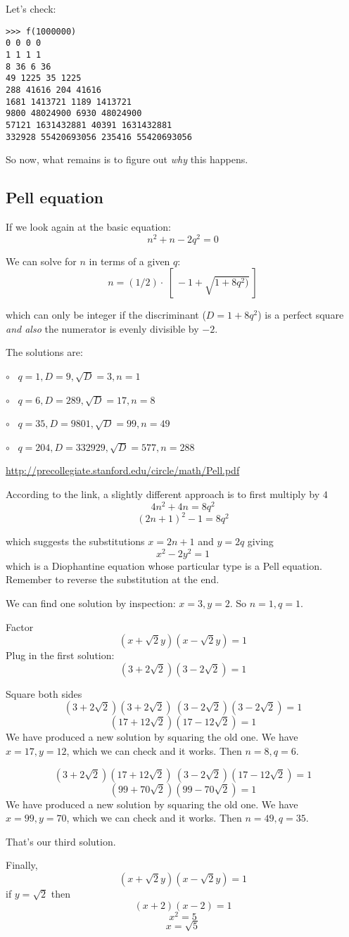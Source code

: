 \documentclass[11pt, oneside]{article}
\begin{document}
Let's check:
\begin{verbatim}
>>> f(1000000)
0 0 0 0
1 1 1 1
8 36 6 36
49 1225 35 1225
288 41616 204 41616
1681 1413721 1189 1413721
9800 48024900 6930 48024900
57121 1631432881 40391 1631432881
332928 55420693056 235416 55420693056
\end{verbatim}

So now, what remains is to figure out \emph{why} this happens.


\subsection*{Pell equation}

If we look again at the basic equation:
\[ n^2 + n - 2q^2 = 0 \]

We can solve for $n$ in terms of a given $q$:
\[ n = (1/2) \cdot \ [ \ -1 + \sqrt{1 + 8q^2)} \ ]  \]

which can only be integer if the discriminant ($D = 1 + 8q^2$) is a perfect square \emph{and also} the numerator is evenly divisible by $-2$.

The solutions are:

$\circ$ \ $q = 1, D = 9, \sqrt{D} = 3, n = 1$

$\circ$ \ $q = 6, D = 289, \sqrt{D} = 17, n = 8$

$\circ$ \ $q = 35, D = 9801, \sqrt{D} = 99, n = 49$

$\circ$ \ $q = 204, D = 332929, \sqrt{D} = 577, n = 288$

\url{http://precollegiate.stanford.edu/circle/math/Pell.pdf}

According to the link, a slightly different approach is to first multiply by $4$
\[ 4n^2 + 4n = 8q^2 \]
\[ (2n + 1)^2 - 1 = 8q^2 \]

which suggests the substitutions $x = 2n + 1$ and $y = 2q$ giving
\[ x^2 - 2y^2 = 1 \]
which is a Diophantine equation whose particular type is a Pell equation.  Remember to reverse the substitution at the end.

We can find one solution by inspection:  $x = 3, y = 2$.  So $n = 1, q = 1$.

Factor
\[ (x + \sqrt{2}y)(x - \sqrt{2}y) = 1 \]
Plug in the first solution:
\[ (3 + 2\sqrt{2})(3 - 2\sqrt{2}) = 1 \]

Square both sides
\[ (3 + 2\sqrt{2})(3 + 2\sqrt{2}) \ (3 - 2\sqrt{2})(3 - 2\sqrt{2}) = 1 \]
\[ (17 + 12\sqrt{2}) (17 - 12\sqrt{2}) = 1 \]
We have produced a new solution by squaring the old one.  We have $x = 17, y = 12$, which we can check and it works.  Then $n = 8, q = 6$.

\[ (3 + 2\sqrt{2})(17 + 12\sqrt{2}) \ (3 - 2\sqrt{2})(17 - 12\sqrt{2}) = 1 \]
\[ (99 + 70\sqrt{2}) (99 - 70\sqrt{2}) = 1 \]
We have produced a new solution by squaring the old one.  We have $x = 99, y = 70$, which we can check and it works.  Then $n = 49, q = 35$.

That's our third solution.

Finally, 
\[ (x + \sqrt{2}y)(x - \sqrt{2}y) = 1 \]
if $y = \sqrt{2}$ then 
\[ (x + 2)(x - 2) = 1 \]
\[ x^2 = 5 \]
\[ x = \sqrt{5} \]
\end{document}
